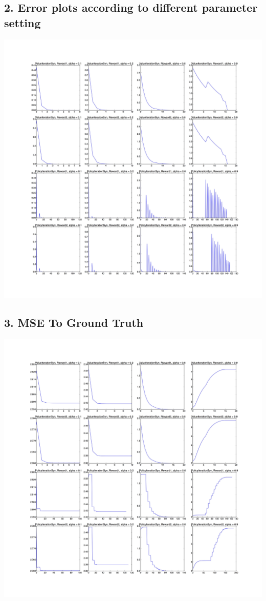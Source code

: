 \documentclass[12pt,a4paper,titlepage]{article}
\begin{document}
\subsection*{2. Error plots according to different parameter setting}
\begin{center}
\includegraphics[scale=0.11]{ErrorPlot.jpg}
\end{center}
\newpage
\subsection*{3. MSE To Ground Truth}
\begin{center}
\includegraphics[scale=0.11]{ErrorToGroundTruth.jpg}
\end{center}
\newpage
\end{document}
